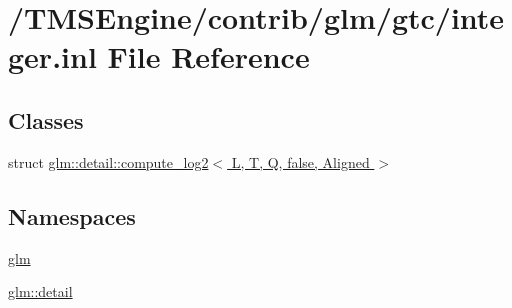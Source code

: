 \hypertarget{gtc_2integer_8inl}{}\section{/\+T\+M\+S\+Engine/contrib/glm/gtc/integer.inl File Reference}
\label{gtc_2integer_8inl}
\subsection*{Classes}
\begin{DoxyCompactItemize}
\item 
struct \hyperlink{structglm_1_1detail_1_1compute__log2_3_01_l_00_01_t_00_01_q_00_01false_00_01_aligned_01_4}{glm\+::detail\+::compute\+\_\+log2$<$ L, T, Q, false, Aligned $>$}
\end{DoxyCompactItemize}
\subsection*{Namespaces}
\begin{DoxyCompactItemize}
\item 
 \hyperlink{namespaceglm}{glm}
\item 
 \hyperlink{namespaceglm_1_1detail}{glm\+::detail}
\end{DoxyCompactItemize}
